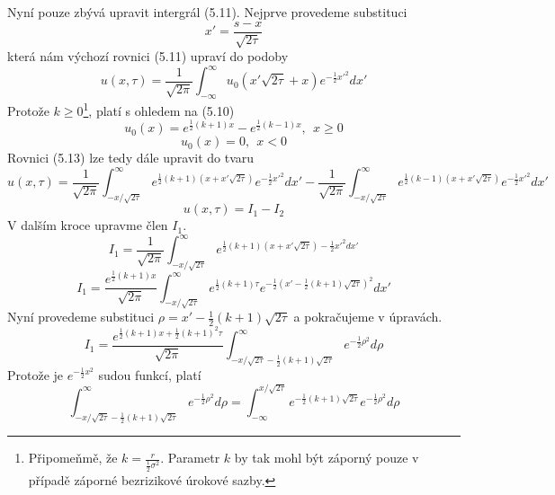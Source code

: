 \documentclass[a4paper]{book}
\begin{document}
Nyní pouze zbývá upravit intergrál (5.11). Nejprve provedeme substituci
\begin{equation}
x' = \frac{s-x}{\sqrt{2 \tau}}
\end{equation}
která nám výchozí rovnici (5.11) upraví do podoby
\begin{equation}
u(x, \tau) = \frac{1}{\sqrt{2 \pi}}\int^{\infty}_{-\infty}u_0(x'\sqrt{2 \tau} + x)e^{-\frac{1}{2}{x'}^2} dx'
\end{equation}
Protože $k \ge 0$\footnote{Připomeňmě, že $k = \frac{r}{\frac{1}{2}\sigma^2}$. Parametr $k$ by tak mohl být záporný pouze v případě záporné bezrizikové úrokové sazby.}, platí s ohledem na (5.10)
\begin{equation*}
u_0(x) = e^{\frac{1}{2}(k + 1)x} - e^{\frac{1}{2}(k - 1)x}, ~~ x \ge 0
\end{equation*}
\begin{equation*}
u_0(x) = 0, ~~ x < 0
\end{equation*}
Rovnici (5.13) lze tedy dále upravit do tvaru
\begin{equation*}
u(x, \tau) = \frac{1}{\sqrt{2 \pi}}\int^{\infty}_{-x/\sqrt{2 \tau}}e^{\frac{1}{2}(k + 1)(x + x'\sqrt{2 \tau})}e^{-\frac{1}{2}{x'}^2}dx' - \frac{1}{\sqrt{2 \pi}}\int^{\infty}_{-x/\sqrt{2 \tau}}e^{\frac{1}{2}(k - 1)(x + x'\sqrt{2 \tau})}e^{-\frac{1}{2}{x'}^2}dx'
\end{equation*}
\begin{equation*}
u(x, \tau) = I_1 - I_2
\end{equation*}
V dalším kroce upravme člen $I_1$.
\begin{equation*}
I_1 = \frac{1}{\sqrt{2 \pi}} \int^{\infty}_{-x/\sqrt{2 \tau}}e^{\frac{1}{2}(k+1)(x + x'\sqrt{2 \tau})-\frac{1}{2}x'^2 dx'}
\end{equation*}
\begin{equation*}
I_1 = \frac{e^{\frac{1}{2}(k+1)x}}{\sqrt{2 \pi}} \int^{\infty}_{-x/\sqrt{2 \tau}}e^{\frac{1}{2}(k + 1)\tau}e^{-\frac{1}{2}(x' - \frac{1}{2}(k + 1)\sqrt{2 \tau})^2}dx'
\end{equation*}
Nyní provedeme substituci $\rho = x' - \frac{1}{2}(k + 1)\sqrt{2 \tau}$ a pokračujeme v úpravách.
\begin{equation*}
I_1 = \frac{e^{\frac{1}{2}(k + 1)x + \frac{1}{2}(k + 1)^2 \tau}}{\sqrt{2 \pi}} \int^{\infty}_{-x/\sqrt{2 \tau} - \frac{1}{2}(k+1)\sqrt{2 \tau}}e^{-\frac{1}{2}\rho^2}d \rho
\end{equation*}
Protože je $e^{-\frac{1}{2}x^2}$ sudou funkcí, platí
\begin{equation*}
\int^{\infty}_{-x/\sqrt{2 \tau} - \frac{1}{2}(k+1)\sqrt{2 \tau}}e^{-\frac{1}{2}\rho^2}d \rho = \int^{x/\sqrt{2 \tau}}_{-\infty} e^{-\frac{1}{2}(k+1)\sqrt{2 \tau}}e^{-\frac{1}{2}\rho^2}d \rho
\end{equation*}
\end{document}
